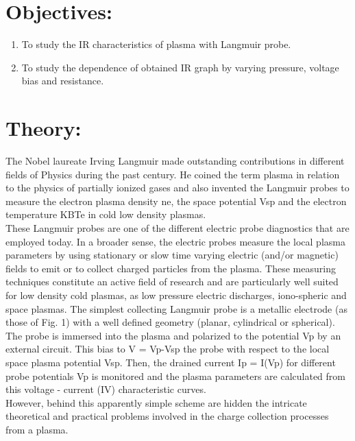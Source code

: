 \documentclass[]{report}[12 pt]
\begin{document}
	

\section*{Objectives:}
\begin{enumerate}
	\item To study the IR characteristics of plasma with Langmuir probe.
	\item To study the dependence of obtained IR graph by varying pressure, voltage bias and resistance.
\end{enumerate}

\section*{Theory:}
The Nobel laureate Irving Langmuir made outstanding contributions in different fields of
Physics during the past century. He coined the term plasma in relation to the physics of
partially ionized gases and also invented the Langmuir probes to measure the electron plasma
density ne, the space potential Vsp and the electron temperature KBTe in cold low density
plasmas.\\
These Langmuir probes are one of the different electric probe diagnostics that are employed today. In
a broader sense, the electric probes measure the local
plasma parameters by using stationary or slow time
varying electric (and/or magnetic) fields to emit or
to collect charged particles from the plasma. These measuring techniques constitute an active field of research and are particularly well suited for low density cold plasmas, as low pressure electric discharges, iono-spheric and space plasmas.
The simplest collecting Langmuir probe is a metallic electrode (as those of Fig. 1) with a well defined geometry (planar, cylindrical or spherical). The probe is immersed into the plasma and polarized to the potential Vp by an external circuit. This bias to V = Vp-Vsp the probe with respect to the local space plasma potential Vsp. Then, the drained current Ip = I(Vp) for different probe potentials Vp is monitored and the plasma parameters are calculated from this voltage -
current (IV) characteristic curves.\\
However, behind this apparently simple scheme are hidden the intricate theoretical and
practical problems involved in the charge collection processes from a plasma.
\end{document}

